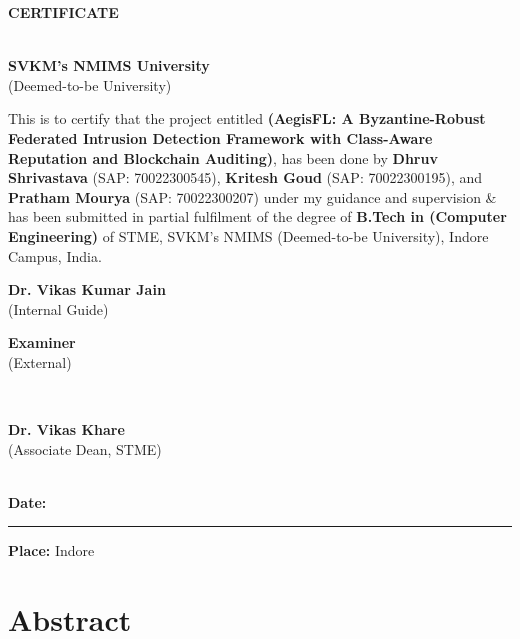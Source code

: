 \documentclass[12pt,a4paper]{report}
\begin{document}
\begin{center}
    {\Large \textbf{CERTIFICATE}}\\[1.2cm]
    \\[0.4cm]
    {\large \textbf{SVKM's NMIMS University}}\\[0.1cm]
    {\normalsize (Deemed-to-be University)}\\[1.2cm]
\end{center}

\noindent This is to certify that the project entitled \textbf{(AegisFL: A Byzantine-Robust Federated Intrusion Detection Framework with Class-Aware Reputation and Blockchain Auditing)}, has been done by \textbf{Dhruv Shrivastava} (SAP: 70022300545), \textbf{Kritesh Goud} (SAP: 70022300195), and \textbf{Pratham Mourya} (SAP: 70022300207) under my guidance and supervision \& has been submitted in partial fulfilment of the degree of \textbf{B.Tech in (Computer Engineering)} of STME, SVKM's NMIMS (Deemed-to-be University), Indore Campus, India.\\[2.5cm]

\noindent
\begin{minipage}{0.48\textwidth}
\textbf{Dr. Vikas Kumar Jain}\\
(Internal Guide)
\end{minipage}
\hfill
\begin{minipage}{0.48\textwidth}
\raggedleft
\textbf{Examiner}\\
(External)
\end{minipage}\\[3.0cm]

\noindent
\begin{minipage}{0.48\textwidth}
\textbf{Dr. Vikas Khare}\\
(Associate Dean, STME)
\end{minipage}\\[1.8cm]

\noindent \textbf{Date:} \rule{4cm}{0.4pt} \hfill \textbf{Place:} Indore

\newpage
\chapter*{Abstract}
\end{document}
